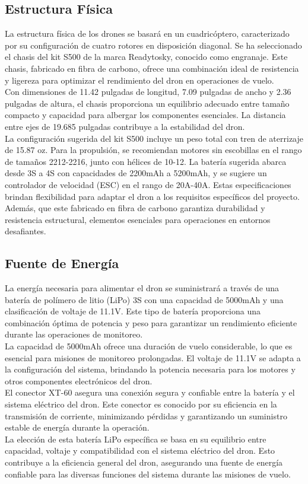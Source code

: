 \subsection{Estructura Física}
La estructura física de los drones se basará en un cuadricóptero, caracterizado por su configuración de cuatro rotores en disposición diagonal. Se ha seleccionado el chasis del kit S500 de la marca Readytosky, conocido como \textquotedbl{}engranaje\textquotedbl{}. Este chasis, fabricado en fibra de carbono, ofrece una combinación ideal de resistencia y ligereza para optimizar el rendimiento del dron en operaciones de vuelo.\\
Con dimensiones de 11.42 pulgadas de longitud, 7.09 pulgadas de ancho y 2.36 pulgadas de altura, el chasis proporciona un equilibrio adecuado entre tamaño compacto y capacidad para albergar los componentes esenciales. La distancia entre ejes de 19.685 pulgadas contribuye a la estabilidad del dron.\\
La configuración sugerida del kit S500 incluye un peso total con tren de aterrizaje de 15.87 oz. Para la propulsión, se recomiendan motores sin escobillas en el rango de tamaños 2212-2216, junto con hélices de 10\textquotedbl{}-12\textquotedbl{}. La batería sugerida abarca desde 3S a 4S con capacidades de 2200mAh a 5200mAh, y se sugiere un controlador de velocidad (ESC) en el rango de 20A-40A.
Estas especificaciones brindan flexibilidad para adaptar el dron a los requisitos específicos del proyecto. Además, que este fabricado en fibra de carbono garantiza durabilidad y resistencia estructural, elementos esenciales para operaciones en entornos desafiantes.
\subsection{Fuente de Energía}
La energía necesaria para alimentar el dron se suministrará a través de una batería de polímero de litio (LiPo) 3S con una capacidad de 5000mAh y una clasificación de voltaje de 11.1V. Este tipo de batería proporciona una combinación óptima de potencia y peso para garantizar un rendimiento eficiente durante las operaciones de monitoreo.\\
La capacidad de 5000mAh ofrece una duración de vuelo considerable, lo que es esencial para misiones de monitoreo prolongadas. El voltaje de 11.1V se adapta a la configuración del sistema, brindando la potencia necesaria para los motores y otros componentes electrónicos del dron.\\
El conector XT-60 asegura una conexión segura y confiable entre la batería y el sistema eléctrico del dron. Este conector es conocido por su eficiencia en la transmisión de corriente, minimizando pérdidas y garantizando un suministro estable de energía durante la operación.\\
La elección de esta batería LiPo específica se basa en su equilibrio entre capacidad, voltaje y compatibilidad con el sistema eléctrico del dron. Esto contribuye a la eficiencia general del dron, asegurando una fuente de energía confiable para las diversas funciones del sistema durante las misiones de vuelo.
